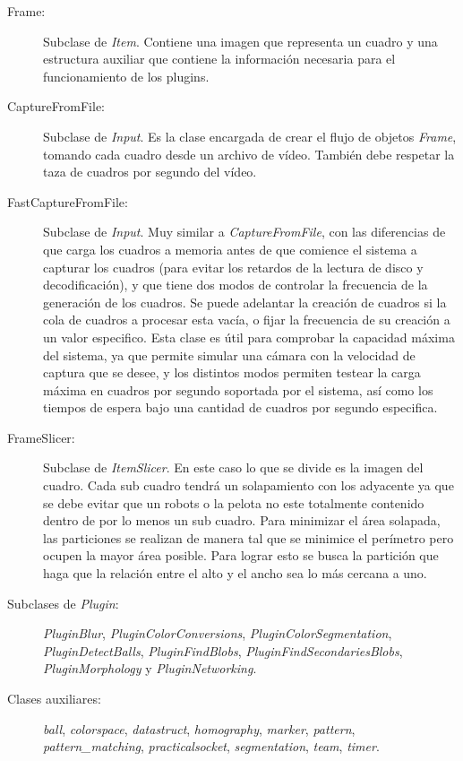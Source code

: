 \begin{description}

	\item[Frame:] Subclase de \emph{Item}. Contiene una imagen que
		representa un cuadro y una estructura auxiliar que contiene la
		información necesaria para el funcionamiento de los plugins.

	\item[CaptureFromFile:] Subclase de \emph{Input}. Es la clase encargada
		de crear el flujo de objetos \emph{Frame}, tomando cada cuadro
		desde un archivo de vídeo. También debe respetar la taza de
		cuadros por segundo del vídeo.

	\item[FastCaptureFromFile:] Subclase de \emph{Input}. Muy similar a
		\emph{CaptureFromFile}, con las diferencias de que carga los
		cuadros a memoria antes de que comience el sistema a capturar
		los cuadros (para evitar los retardos de la lectura de disco y
		decodificación), y que tiene dos modos de controlar la
		frecuencia de la generación de los cuadros. Se puede adelantar
		la creación de cuadros si la cola de cuadros a procesar esta
		vacía, o fijar la frecuencia de su creación a un valor
		especifico. Esta clase es útil para comprobar la capacidad
		máxima del sistema, ya que permite simular una cámara con la
		velocidad de captura que se desee, y los distintos modos
		permiten testear la carga máxima en cuadros por segundo
		soportada por el sistema, así como los tiempos de espera bajo
		una cantidad de cuadros por segundo especifica.

	\item[FrameSlicer:] Subclase de \emph{ItemSlicer}. En este caso lo que
		se divide es la imagen del cuadro. Cada sub cuadro tendrá un
		solapamiento con los adyacente ya que se debe evitar que un
		robots o la pelota no este totalmente contenido dentro de por lo
		menos un sub cuadro. Para minimizar el área solapada, las
		particiones se realizan de manera tal que se minimice el
		perímetro pero ocupen la mayor área posible. Para lograr esto se
		busca la partición que haga que la relación entre el alto y el
		ancho sea lo más cercana a uno.

	\item[Subclases de \emph{Plugin}:] \emph{PluginBlur},
		\emph{PluginColorConversions}, \emph{PluginColorSegmentation},
		\emph{PluginDetectBalls}, \emph{PluginFindBlobs},
		\emph{PluginFindSecondariesBlobs}, \emph{PluginMorphology} y
		\emph{PluginNetworking}.

	\item[Clases auxiliares:] \emph{ball}, \emph{colorspace},
		\emph{datastruct}, \emph{homography}, \emph{marker},
		\emph{pattern}, \emph{pattern\_matching},
		\emph{practicalsocket}, \emph{segmentation}, \emph{team},
		\emph{timer}.

\end{description}

